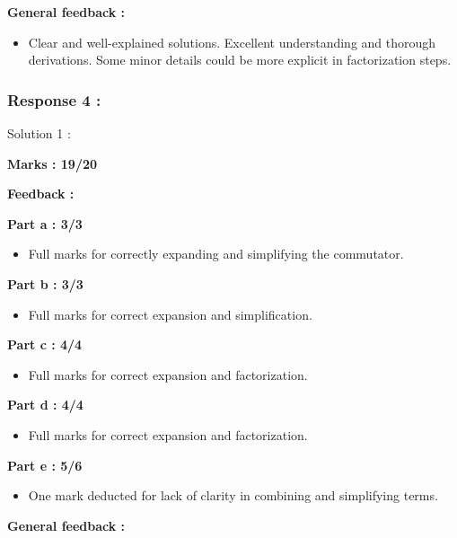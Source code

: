 \documentclass[a4paper,11pt]{article}
\begin{document}
\textbf{General feedback :}

\begin{itemize}
    \item Clear and well-explained solutions. Excellent understanding and thorough derivations. Some minor details could be more explicit in factorization steps.
\end{itemize}



\subsubsection*{Response 4 :}

Solution 1 :

\textbf{Marks : 19/20}

\textbf{Feedback :}

\textbf{Part a : 3/3}

\begin{itemize}
    \item Full marks for correctly expanding and simplifying the commutator.
\end{itemize}


\textbf{Part b : 3/3}

\begin{itemize}
    \item Full marks for correct expansion and simplification.
\end{itemize}


\textbf{Part c : 4/4}

\begin{itemize}
    \item Full marks for correct expansion and factorization.
\end{itemize}


\textbf{Part d : 4/4}

\begin{itemize}
    \item Full marks for correct expansion and factorization.
\end{itemize}



\textbf{Part e : 5/6}

\begin{itemize}
    \item One mark deducted for lack of clarity in combining and simplifying terms.
\end{itemize}


\textbf{General feedback :}
\end{document}
